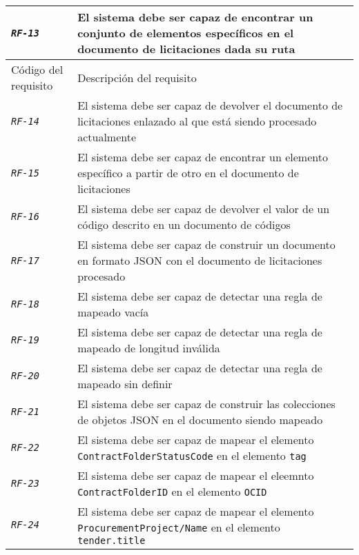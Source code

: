 \begin{longtable}{|| M{3cm} | M{12cm} ||}
                \hline
                    \texttt{\textit{RF-13}} & El sistema debe ser capaz de encontrar un conjunto de elementos específicos en el documento de licitaciones dada su ruta \\
                \hline
                    Código del requisito & Descripción del requisito \\
                \hline
                \hline
                    \texttt{\textit{RF-14}} & El sistema debe ser capaz de devolver el documento de licitaciones enlazado al que está siendo procesado actualmente \\
                \hline
                    \texttt{\textit{RF-15}} & El sistema debe ser capaz de encontrar un elemento específico a partir de otro en el documento de licitaciones \\
                \hline
                    \texttt{\textit{RF-16}} & El sistema debe ser capaz de devolver el valor de un código descrito en un documento de códigos \\
                \hline
                    \texttt{\textit{RF-17}} & El sistema debe ser capaz de construir un documento en formato JSON con el documento de licitaciones procesado \\
                \hline
                    \texttt{\textit{RF-18}} & El sistema debe ser capaz de detectar una regla de mapeado vacía \\
                \hline
                    \texttt{\textit{RF-19}} & El sistema debe ser capaz de detectar una regla de mapeado de longitud inválida \\
                \hline
                    \texttt{\textit{RF-20}} & El sistema debe ser capaz de detectar una regla de mapeado sin definir \\
                \hline
                    \texttt{\textit{RF-21}} & El sistema debe ser capaz de construir las colecciones de objetos JSON en el documento siendo mapeado \\
                \hline
                    \texttt{\textit{RF-22}} & El sistema debe ser capaz de mapear el elemento \texttt{ContractFolderStatusCode} en el elemento \texttt{tag} \\
                \hline
                    \texttt{\textit{RF-23}} & El sistema debe ser capaz de mapear el eleemnto \texttt{ContractFolderID} en el elemento \texttt{OCID} \\
                \hline
                    \texttt{\textit{RF-24}} & El sistema debe ser capaz de mapear el elemento \texttt{ProcurementProject/Name} en el elemento \texttt{tender.title} \\

\end{longtable}
